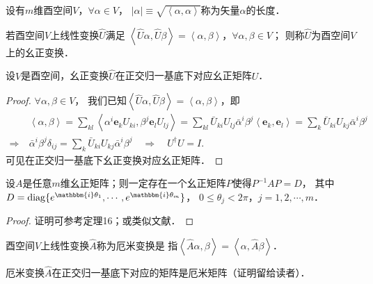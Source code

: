 \begin{definition}
    设有$m$维酉空间$V$，$\forall \alpha \in V$，
    $|\alpha|\equiv\sqrt{\left<\alpha,\alpha\right>}$称为矢量$\alpha$的{\heiti 长度}．
\end{definition}

\begin{definition}
    若酉空间$V$上线性变换$\hat{U}$满足
    $\left<\hat{U}\alpha,\hat{U}\beta\right>=\left<\alpha,\beta\right>$，$\forall \alpha,\beta \in V$；
    则称$\hat{U}$为酉空间$V$上的{\heiti 幺正变换}．
\end{definition}


\begin{theorem}
    设$V$是酉空间，幺正变换$\hat{U}$在正交归一基底下对应幺正矩阵$U$．
\end{theorem}
\begin{proof}
    $\forall \alpha,\beta \in V$，
    我们已知$\left<\hat{U}\alpha,\hat{U}\beta\right>=\left<\alpha,\beta\right>$，即
    \begin{align*}
        &\left<\alpha,\beta\right>=\sum_{kl}\left<\alpha^i \boldsymbol{e}_k U_{ki}, \beta^j \boldsymbol{e}_l U_{lj} \right>
        =\sum_{kl}\bar{U}_{ki} U_{lj} \bar{\alpha}^i \beta^j \left< \boldsymbol{e}_k, \boldsymbol{e}_l\right>
        =\sum_k \bar{U}_{ki} U_{kj} \bar{\alpha}^i \beta^j \\
        \Rightarrow\ & \bar{\alpha}^i \beta^j \delta_{ij}=\sum\nolimits_k \bar{U}_{ki} U_{kj} \bar{\alpha}^i \beta^j 
        \quad \Rightarrow \quad U^\dagger U = I.
    \end{align*}
    可见在正交归一基底下幺正变换对应幺正矩阵．
\end{proof}

\begin{theorem}\label{chcx:thm_UD}
	设$A$是任意$m$维幺正矩阵；则一定存在一个幺正矩阵$P$使得$P^{-1}A P=D$，
	其中$D={\rm diag}\{e^{\mathbbm{i}\theta_1},\cdots,e^{\mathbbm{i}\theta_m}\}$，
	$0\leqslant \theta_j <2\pi$，$j=1,2,\cdots,m$．
\end{theorem}
\begin{proof}
	证明可参考\parencite[p.522]{qiuws-2019-v2}定理16；或类似文献．
\end{proof}


\begin{definition}
    酉空间$V$上线性变换$\hat{A}$称为{\heiti 厄米变换}是
    指$\left<\hat{A}\alpha,\beta\right>=\left<\alpha,\hat{A}\beta\right>$．
\end{definition}
厄米变换$\hat{A}$在正交归一基底下对应的矩阵是厄米矩阵（证明留给读者）．



